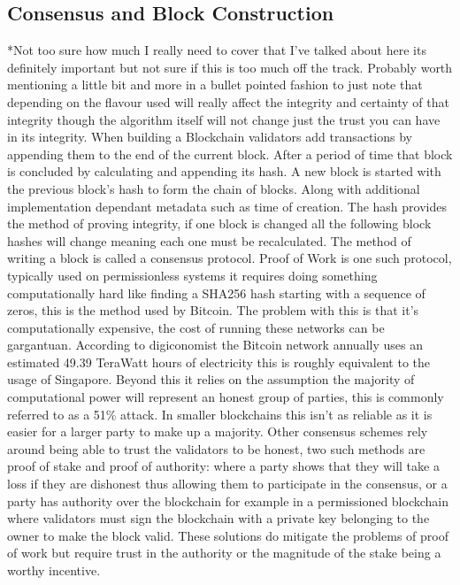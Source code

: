 \documentclass{entcs}
\begin{document}

\subsection{Consensus and Block Construction}
*Not too sure how much I really need to cover that I've talked about here its definitely important but not sure if this is too much off the track. Probably worth mentioning a little bit and more in a bullet pointed fashion to just note that depending on the flavour used will really affect the integrity and certainty of that integrity though the algorithm itself will not change just the trust you can have in its integrity.
When building a Blockchain validators add transactions by appending them to the end of the current block. After a period of time that block is concluded by calculating and appending its hash. A new block is started with the previous block's hash to form the chain of blocks. Along with additional implementation dependant metadata such as time of creation. The hash provides the method of proving integrity, if one block is changed all the following block hashes will change meaning each one must be recalculated. The method of writing a block is called a consensus protocol. Proof of Work\cite{BTCWhitepaper} is one such protocol, typically used on permissionless systems it requires doing something computationally hard like finding a SHA256 hash starting with a sequence of zeros, this is the method used by Bitcoin. The problem with this is that it's computationally expensive, the cost of running these networks can be gargantuan. According to digiconomist \cite{BTCenergy} the Bitcoin network annually uses an estimated 49.39 TeraWatt hours of electricity this is roughly equivalent to the usage of Singapore. Beyond this it relies on the assumption the majority of computational power will represent an honest group of parties, this is commonly referred to as a 51\% attack\cite{BTCWhitepaper}\cite{baliga2017understanding}. In smaller blockchains this isn't as reliable as it is easier for a larger party to make up a majority. 
Other consensus schemes rely around being able to trust the validators to be honest, two such methods are proof of stake and proof of authority\cite{blockchainBeginners}\cite{baliga2017understanding}: where a party shows that they will take a loss if they are dishonest thus allowing them to participate in the consensus, or a party has authority over the blockchain for example in a permissioned blockchain where validators must sign the blockchain with a private key belonging to the owner to make the block valid. These solutions do mitigate the problems of proof of work but require trust in the authority or the magnitude of the stake being a worthy incentive.
\end{document}
